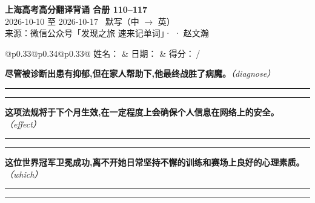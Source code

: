 \documentclass[11pt,a4paper]{article}
\newcommand{\num}[1]{\makebox[1.9em][r]{#1.}\hspace{0.3em}}
\newcommand{\wline}{\noindent\rule{\linewidth}{0.4pt}}
\newcommand{\prompt}[1]{\emph{\textcolor{tipblue}{\small（#1）}}}
\begin{document}
\pagestyle{plain}
\begin{center}
{\LARGE\bfseries 上海高考高分翻译背诵 \quad 合册 110–117}\\[0.25em]
{\large 2026-10-10 至 2026-10-17 \quad\ 默写（中 $\to$ 英）}\\[0.35em]
{\footnotesize 来源：微信公众号「发现之旅 速来记单词」·  · 赵文瀚}
\end{center}

\vspace{0.4em}
\noindent\begin{tabular}{@{}p{0.33\textwidth}@{}p{0.34\textwidth}@{}p{0.33\textwidth}@{}}
姓名：\underline{\hspace{2.0cm}} & 日期：\underline{\hspace{2.0cm}} & 得分：\underline{\hspace{1.4cm}}\,/ \\
\end{tabular}

\vspace{0.5em}

\vspace{0.8em}
\vspace{0.35em}\vspace{0.15em}

\begin{minipage}{\linewidth}

\num{1}\textbf{尽管被诊断出患有抑郁,但在家人帮助下,他最终战胜了病魔。}\prompt{diagnose}

\vspace{0.3em}

\wline\vspace{0.3em}
\wline

\end{minipage}

\begin{minipage}{\linewidth}

\num{2}\textbf{这项法规将于下个月生效,在一定程度上会确保个人信息在网络上的安全。}\prompt{effect}

\vspace{0.3em}

\wline\vspace{0.3em}
\wline

\end{minipage}

\begin{minipage}{\linewidth}

\num{3}\textbf{这位世界冠军卫冕成功,离不开她日常坚持不懈的训练和赛场上良好的心理素质。}\prompt{which}

\vspace{0.3em}

\wline\vspace{0.3em}
\wline

\end{minipage}
\end{document}
